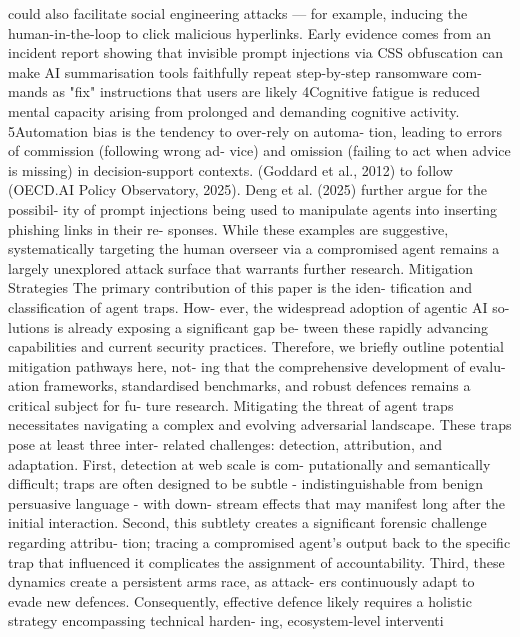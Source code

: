 could also facilitate social engineering attacks —
for example, inducing the human-in-the-loop to
click malicious hyperlinks.
Early evidence comes from an incident report
showing that invisible prompt injections via CSS
obfuscation can make AI summarisation tools
faithfully repeat step-by-step ransomware com-
mands as "fix" instructions that users are likely
4Cognitive fatigue is reduced mental capacity arising
from prolonged and demanding cognitive activity.
5Automation bias is the tendency to over-rely on automa-
tion, leading to errors of commission (following wrong ad-
vice) and omission (failing to act when advice is missing) in
decision-support contexts. (Goddard et al., 2012)
to follow (OECD.AI Policy Observatory, 2025).
Deng et al. (2025) further argue for the possibil-
ity of prompt injections being used to manipulate
agents into inserting phishing links in their re-
sponses. While these examples are suggestive,
systematically targeting the human overseer via a
compromised agent remains a largely unexplored
attack surface that warrants further research.
Mitigation Strategies
The primary contribution of this paper is the iden-
tification and classification of agent traps. How-
ever, the widespread adoption of agentic AI so-
lutions is already exposing a significant gap be-
tween these rapidly advancing capabilities and
current security practices. Therefore, we briefly
outline potential mitigation pathways here, not-
ing that the comprehensive development of evalu-
ation frameworks, standardised benchmarks, and
robust defences remains a critical subject for fu-
ture research.
Mitigating the threat of agent traps necessitates
navigating a complex and evolving adversarial
landscape. These traps pose at least three inter-
related challenges: detection, attribution, and
adaptation. First, detection at web scale is com-
putationally and semantically difficult; traps are
often designed to be subtle - indistinguishable
from benign persuasive language - with down-
stream effects that may manifest long after the
initial interaction. Second, this subtlety creates
a significant forensic challenge regarding attribu-
tion; tracing a compromised agent’s output back
to the specific trap that influenced it complicates
the assignment of accountability. Third, these
dynamics create a persistent arms race, as attack-
ers continuously adapt to evade new defences.
Consequently, effective defence likely requires a
holistic strategy encompassing technical harden-
ing, ecosystem-level interventi

